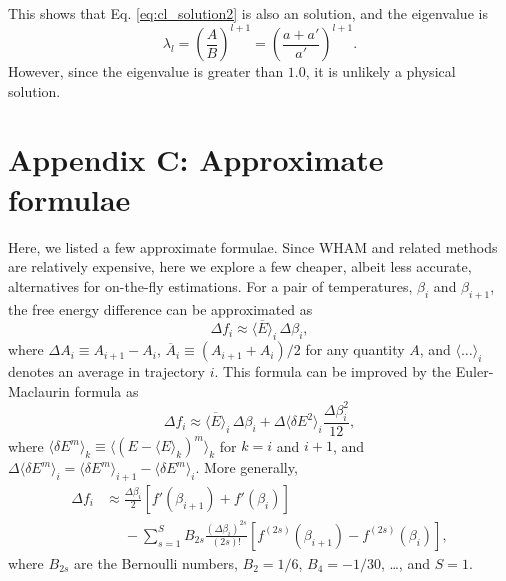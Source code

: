 \documentclass[aip,jcp,preprint,notitlepage, superscriptaddress]{revtex4-1}
\begin{document}
This shows that
Eq. \eqref{eq:cl_solution2}
is also an solution,
and the eigenvalue is
\begin{equation}
\lambda_l
=
\left( \frac{ A }{ B } \right)^{l + 1}
=
\left( \frac{ a + a' }{ a' } \right)^{l + 1}.
\end{equation}
%
However,
since the eigenvalue is greater than $1.0$,
it is unlikely a physical solution.




\section{Appendix C: Approximate formulae}


Here, we listed a few approximate formulae.
%
Since WHAM and related methods
are relatively expensive,
here we explore a few cheaper,
albeit less accurate, alternatives
for on-the-fly estimations\cite{park2007}.
%
For a pair of temperatures,
$\beta_i$ and $\beta_{i+1}$,
the free energy difference
can be approximated as\cite{park2007}
%
\begin{equation}
\Delta f_i
\approx
\overline{ \langle E \rangle }_i \, \Delta \beta_i,
\label{eq:df_eav}
\end{equation}
%
where
$\Delta A_i \equiv A_{i+1} - A_i$,
$\overline{ A }_i \equiv (A_{i+1} + A_i)/2$
for any quantity $A$,
and
$\langle\dots\rangle_i$
denotes an average in trajectory $i$.
%
This formula can be improved
by the Euler-Maclaurin formula\cite{
arfken, *whittaker, *wang_specfunc}
as
%
\begin{equation}
\Delta f_i
\approx
\overline{ \langle E \rangle }_i \, \Delta \beta_i
+
\Delta \langle \delta E^2 \rangle_i
\frac{ \Delta \beta_i^2 }{ 12 },
\label{eq:df_eavb}
\end{equation}
where
$\langle \delta E^m \rangle_k
\equiv \langle (E - \langle E \rangle_k)^m \rangle_k$
for $k = i$ and $i + 1$,
and
$\Delta \langle \delta E^m \rangle_i
= \langle \delta E^m \rangle_{i + 1}
- \langle \delta E^m \rangle_{i}$.
%
More generally,
%
\begin{align*}
\Delta f_i
&\approx
\frac{\Delta \beta_i}{2}
\left[
  f'(\beta_{i+1}) + f'(\beta_i)
\right]
\\
&\phantom{=}
-
\sum_{s = 1}^{S}
  B_{2s}
  \frac{ (\Delta \beta_i)^{2s} } { (2 s)! }
  \left[
    f^{(2s)}(\beta_{i+1})
    -
    f^{(2s)}(\beta_i)
  \right],
\end{align*}
%
where $B_{2s}$ are the Bernoulli numbers,
$B_2 = 1/6$, $B_4 = -1/30$, \ldots,
and $S = 1$.
\end{document}
